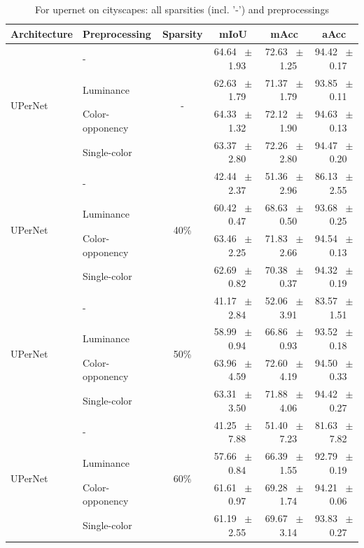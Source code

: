 \begin{table}[h]
  \centering
  \caption{For upernet on cityscapes: all sparsities (incl. '-') and preprocessings}
  \begin{tabular}{@{}l l c c c c@{}}
    \toprule
    Architecture & Preprocessing & Sparsity & mIoU & mAcc & aAcc \\
    \midrule
    \multirow{4}{*}{UPerNet} & - & \multirow{4}{*}{-} & 64.64 ~$\pm$~ 1.93 & 72.63 ~$\pm$~ 1.25 & 94.42 ~$\pm$~ 0.17 \\
    & Luminance &  & 62.63 ~$\pm$~ 1.79 & 71.37 ~$\pm$~ 1.79 & 93.85 ~$\pm$~ 0.11 \\
    & Color-opponency &  & 64.33 ~$\pm$~ 1.32 & 72.12 ~$\pm$~ 1.90 & 94.63 ~$\pm$~ 0.13 \\
    & Single-color &  & 63.37 ~$\pm$~ 2.80 & 72.26 ~$\pm$~ 2.80 & 94.47 ~$\pm$~ 0.20 \\
    \midrule
    \multirow{4}{*}{UPerNet} & - & \multirow{4}{*}{40\%} & 42.44 ~$\pm$~ 2.37 & 51.36 ~$\pm$~ 2.96 & 86.13 ~$\pm$~ 2.55 \\
    & Luminance &  & 60.42 ~$\pm$~ 0.47 & 68.63 ~$\pm$~ 0.50 & 93.68 ~$\pm$~ 0.25 \\
    & Color-opponency &  & 63.46 ~$\pm$~ 2.25 & 71.83 ~$\pm$~ 2.66 & 94.54 ~$\pm$~ 0.13 \\
    & Single-color &  & 62.69 ~$\pm$~ 0.82 & 70.38 ~$\pm$~ 0.37 & 94.32 ~$\pm$~ 0.19 \\
    \midrule
    \multirow{4}{*}{UPerNet} & - & \multirow{4}{*}{50\%} & 41.17 ~$\pm$~ 2.84 & 52.06 ~$\pm$~ 3.91 & 83.57 ~$\pm$~ 1.51 \\
    & Luminance &  & 58.99 ~$\pm$~ 0.94 & 66.86 ~$\pm$~ 0.93 & 93.52 ~$\pm$~ 0.18 \\
    & Color-opponency &  & 63.96 ~$\pm$~ 4.59 & 72.60 ~$\pm$~ 4.19 & 94.50 ~$\pm$~ 0.33 \\
    & Single-color &  & 63.31 ~$\pm$~ 3.50 & 71.88 ~$\pm$~ 4.06 & 94.42 ~$\pm$~ 0.27 \\
    \midrule
    \multirow{4}{*}{UPerNet} & - & \multirow{4}{*}{60\%} & 41.25 ~$\pm$~ 7.88 & 51.40 ~$\pm$~ 7.23 & 81.63 ~$\pm$~ 7.82 \\
    & Luminance &  & 57.66 ~$\pm$~ 0.84 & 66.39 ~$\pm$~ 1.55 & 92.79 ~$\pm$~ 0.19 \\
    & Color-opponency &  & 61.61 ~$\pm$~ 0.97 & 69.28 ~$\pm$~ 1.74 & 94.21 ~$\pm$~ 0.06 \\
    & Single-color &  & 61.19 ~$\pm$~ 2.55 & 69.67 ~$\pm$~ 3.14 & 93.83 ~$\pm$~ 0.27 \\
    \midrule

\end{tabular}
\end{table}
